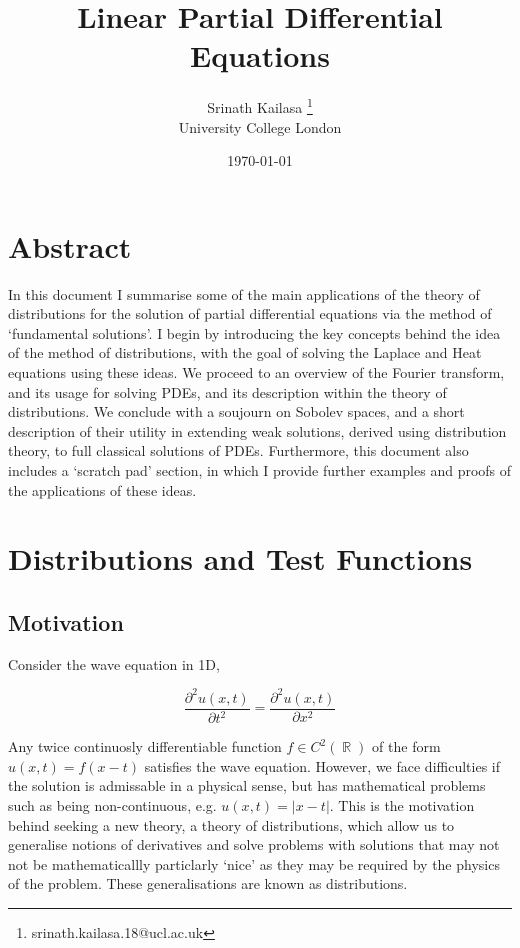 \documentclass[12pt, a4]{article}
\title{Linear Partial Differential Equations}
\author{Srinath Kailasa \thanks{srinath.kailasa.18@ucl.ac.uk} \\ \small University College London}
\date{\today}
\DeclareMathOperator\reals{\mathbb{R}}
\begin{document}
\maketitle

\section*{Abstract}

In this document I summarise some of the main applications of the theory of distributions for the solution of partial differential equations via the method of `fundamental solutions'. I begin by introducing the key concepts behind the idea of the method of distributions, with the goal of solving the Laplace and Heat equations using these ideas. We proceed to an overview of the Fourier transform, and its usage for solving PDEs, and its description within the theory of distributions. We conclude with a soujourn on Sobolev spaces, and a short description of their utility in extending weak solutions, derived using distribution theory, to full classical solutions of PDEs. Furthermore, this document also includes a `scratch pad' section, in which I provide further examples and proofs of the applications of these ideas.

\section{Distributions and Test Functions}

\subsection{Motivation}

Consider the wave equation in 1D,

\begin{equation}
    \frac{\partial^2u(x, t)}{\partial t^2} = \frac{\partial^2u(x, t)}{\partial x^2}
    \label{eq:wave_eq_1d}
\end{equation}

Any twice continuosly differentiable function $f \in C^2(\reals)$ of the form $u(x, t) = f(x-t)$ satisfies the wave equation. However, we face difficulties if the solution is admissable in a physical sense, but has mathematical problems such as being non-continuous, e.g. $u(x, t) = |x-t|$. This is the motivation behind seeking a new theory, a theory of distributions, which allow us to generalise notions of derivatives and solve problems with solutions that may not not be mathematicallly particlarly `nice' as they may be required by the physics of the problem. These generalisations are known as distributions.
\end{document}
